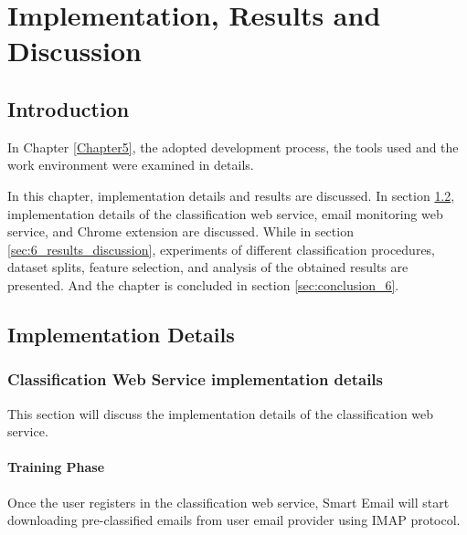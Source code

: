 
\chapter{Implementation, Results and Discussion} %

\label{Chapter6} %



\section{Introduction}
In Chapter \ref{Chapter5}, the adopted development process, the tools used and the work environment were examined in details.

In this chapter, implementation details and results are discussed. In section
\ref{sec:6_imp_details}, implementation details of the classification web service,
email monitoring web service, and Chrome extension are discussed. While in section
\ref{sec:6_results_discussion}, experiments of different classification procedures,
dataset splits, feature selection, and analysis of the obtained results are presented. 
And the chapter is concluded in section \ref{sec:conclusion_6}.

\section{Implementation Details}
\label{sec:6_imp_details}

\subsection{Classification Web Service implementation details}
This section will discuss the implementation details of the classification web service.


    \subsubsection{Training Phase}
    Once the user registers in the classification web service, Smart Email will start downloading pre-classified emails from
    user email provider using IMAP protocol.

